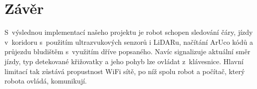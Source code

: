 \section{Závěr}

S~výslednou implementací našeho projektu je robot schopen sledování čáry, jízdy v~koridoru s~použitím ultrazvukových senzorů i LiDARu, načítání ArUco kódů a průjezdu bludištěm s~využitím dříve popsaného. Navíc signalizuje aktuální směr jízdy, typ detekované křižovatky a jeho pohyb lze ovládat z~klávesnice.
Hlavní limitací tak zůstává propustnost WiFi sítě, po níž spolu robot a počítač, který robota ovládá, komunikují.

